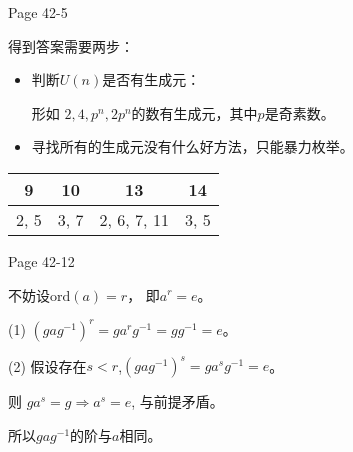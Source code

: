 \documentclass{ximera}
\begin{document}
\begin{problem}
\begin{solution}
    \end{solution}
\end{problem}

\newpage
\begin{problem} Page 42-5
    \begin{solution} 得到答案需要两步：
        \begin{itemize}
            \item 判断$U(n)$是否有生成元：
    
            形如 $2, 4, p^n, 2p^n$的数有生成元，其中$p$是奇素数。
            \item 寻找所有的生成元没有什么好方法，只能暴力枚举。
        \end{itemize}
        \begin{tabular} {|c|c|c|c|}
            \hline 9&10&13&14 \\
            \hline 2, 5&3, 7&2, 6, 7, 11&3, 5 \\
            \hline
        \end{tabular}
    \end{solution}
\end{problem}

\begin{problem} Page 42-12
    \begin{solution} 不妨设$\text{ord}(a)=r$， 即$a^r=e$。

        (1) $(gag^{-1})^r=ga^rg^{-1}=gg^{-1}=e$。

        (2) 假设存在$s<r$,$(gag^{-1})^s=ga^sg^{-1}=e$。

            则 $ga^s=g \Rightarrow a^s=e$, 与前提矛盾。

        所以$gag^{-1}$的阶与$a$相同。
    \end{solution}
\end{problem}
\end{document}
